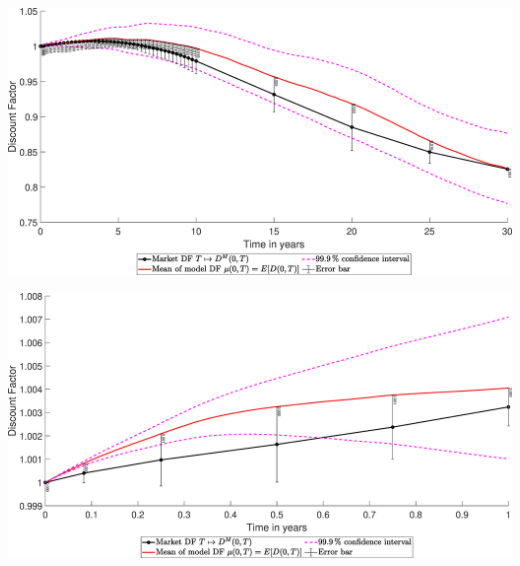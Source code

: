 \begin{landscape}
\includegraphics[width=.95\columnwidth]{DF/DF_A_1}
\end{landscape}
\begin{landscape}
\includegraphics[width=.95\columnwidth]{DF/DF_A_2}
\end{landscape}
